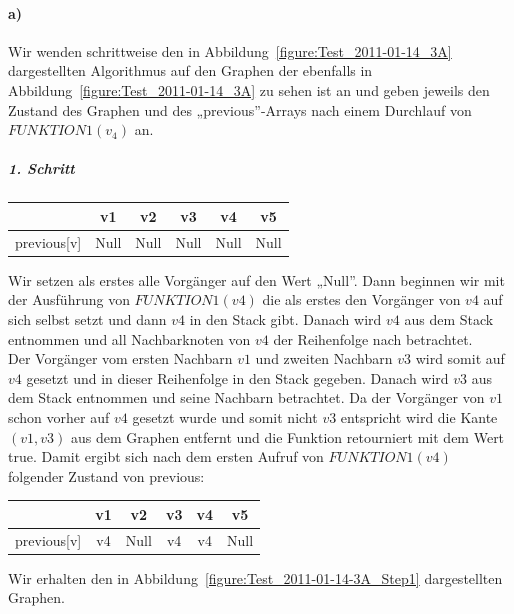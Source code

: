 \documentclass[a4paper, 12pt]{article}
\begin{document}
\paragraph{a)}

Wir wenden schrittweise den in Abbildung~\ref{figure:Test_2011-01-14_3A}  dargestellten Algorithmus auf den Graphen der ebenfalls in Abbildung~\ref{figure:Test_2011-01-14_3A} zu sehen ist an und geben jeweils den Zustand des Graphen und des „previous”-Arrays nach einem Durchlauf von $FUNKTION1(v_4)$ an.

\subparagraph{1. Schritt}

\begin{center}
	\begin{tabular}{lccccc}
					& v1	& v2	& v3 & v4	& v5\\
		\hline
		previous[v] & Null	& Null	& Null	& Null	& Null \\
	\end{tabular}
\end{center}

Wir setzen als erstes alle Vorgänger auf den Wert „Null”. Dann beginnen wir mit der Ausführung von $FUNKTION1(v4)$ die als erstes den Vorgänger von $v4$ auf sich selbst setzt und dann $v4$ in den Stack gibt. Danach wird $v4$ aus dem Stack entnommen und all Nachbarknoten von $v4$ der Reihenfolge nach betrachtet.\\

Der Vorgänger vom ersten Nachbarn $v1$ und zweiten Nachbarn $v3$ wird somit auf $v4$ gesetzt und in dieser Reihenfolge in den Stack gegeben. Danach wird $v3$ aus dem Stack entnommen und seine Nachbarn betrachtet. Da der Vorgänger von $v1$ schon vorher auf $v4$ gesetzt wurde und somit nicht $v3$ entspricht wird die Kante $(v1,v3)$ aus dem Graphen entfernt und die Funktion retourniert mit dem Wert true. Damit ergibt sich nach dem ersten Aufruf von $FUNKTION1(v4)$ folgender Zustand von previous:

\begin{center}
	\begin{tabular}{lccccc}
					& v1	& v2	& v3 & v4	& v5\\
		\hline
		previous[v] & v4	& Null	& v4 & v4	& Null\\
	\end{tabular}
\end{center}

Wir erhalten den in Abbildung~\ref{figure:Test_2011-01-14-3A_Step1} dargestellten Graphen.
\end{document}
